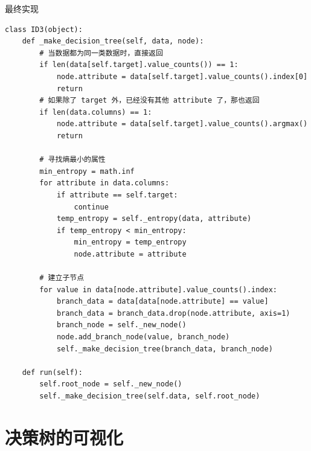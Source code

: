 \documentclass[10pt]{beamer}
\begin{document}
\begin{frame}{最终实现}
\begin{verbatim}
class ID3(object):
    def _make_decision_tree(self, data, node):
        # 当数据都为同一类数据时，直接返回
        if len(data[self.target].value_counts()) == 1:
            node.attribute = data[self.target].value_counts().index[0]
            return
        # 如果除了 target 外，已经没有其他 attribute 了，那也返回
        if len(data.columns) == 1:
            node.attribute = data[self.target].value_counts().argmax()
            return

        # 寻找熵最小的属性
        min_entropy = math.inf
        for attribute in data.columns:
            if attribute == self.target:
                continue
            temp_entropy = self._entropy(data, attribute)
            if temp_entropy < min_entropy:
                min_entropy = temp_entropy
                node.attribute = attribute
        
        # 建立子节点
        for value in data[node.attribute].value_counts().index:
            branch_data = data[data[node.attribute] == value]
            branch_data = branch_data.drop(node.attribute, axis=1)
            branch_node = self._new_node()
            node.add_branch_node(value, branch_node)
            self._make_decision_tree(branch_data, branch_node)

    def run(self):
        self.root_node = self._new_node()
        self._make_decision_tree(self.data, self.root_node)              
\end{verbatim}
\end{frame}

\section{决策树的可视化}
\end{document}
